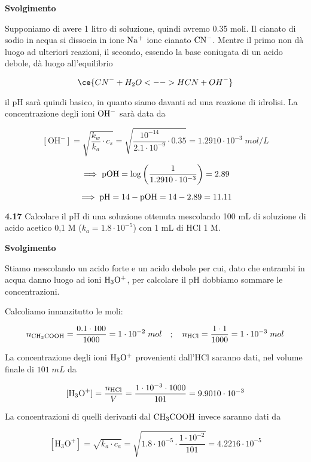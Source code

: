 \vspace{0.2cm}\large\textbf{Svolgimento}\normalsize

\vspace{0.2cm}Supponiamo di avere 1 litro di soluzione, quindi avremo 0.35 moli. Il cianato di sodio in acqua si dissocia in ione $\rm Na^+$ ione cianato $\rm CN^-$. Mentre il primo non dà luogo ad ulteriori reazioni, il secondo, essendo la base coniugata di un acido debole, dà luogo all'equilibrio

$$\ce{CN^- + H_2O <--> HCN + OH^-}$$

il pH sarà quindi basico, in quanto siamo davanti ad una reazione di idrolisi. La concentrazione degli ioni $\rm OH^-$ sarà data da


$$[\text{OH}^-]
=\sqrt{\frac{k_w}{k_a}\cdot c_s}
=\sqrt{\frac{10^{-14}}{2.1 \cdot 10^{-9}} \cdot 0.35}
=1.2910 \cdot 10^{-3}\;mol/L$$

$$\implies \rm pOH
=\log{\left(\frac{1}{1.2910 \cdot 10^{-3}}\right)}
=2.89$$

$$\implies \rm pH=14-pOH=14-2.89=11.11$$

\vspace{0.2cm}\textbf{4.17} Calcolare il pH di una soluzione ottenuta mescolando 100 mL di soluzione di acido acetico 0,1 M ($k_a=1.8 \cdot 10^{-5}$) con 1 mL di HCl 1 M.

\vspace{0.2cm}\large\textbf{Svolgimento}\normalsize

\vspace{0.2cm}Stiamo mescolando un acido forte e un acido debole per cui, dato che entrambi in acqua danno luogo ad ioni $\rm H_3O^+$, per calcolare il pH dobbiamo sommare le concentrazioni.

Calcoliamo innanzitutto le moli:

$$n_{\rm CH_3COOH}=\frac{0.1 \cdot 100}{1000}=1 \cdot 10^{-2}\;mol
\quad;\quad
n_{\rm HCl}=\frac{1 \cdot 1}{1000}=1 \cdot 10^{-3}\;mol$$

La concentrazione degli ioni $\rm H_3O^+$ provenienti dall'HCl saranno dati, nel volume finale di $101\;mL$ da

$$[\text{H}_3\text{O}^+]=\frac{n_{\rm HCl}}{V}
=\frac{1 \cdot 10^{-3} \cdot 1000}{101}
=9.9010\cdot 10^{-3}$$

La concentrazioni di quelli derivanti dal $\rm CH_3COOH$ invece saranno dati da

$$[\text{H}_3\text{O}^+]=\sqrt{k_a \cdot c_a}
=\sqrt{1.8 \cdot 10^{-5}\cdot \frac{1 \cdot 10^{-2}}{101}}
=4.2216 \cdot 10^{-5}$$

